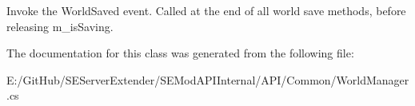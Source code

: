 Invoke the World\+Saved event. Called at the end of all world save methods, before releasing m\+\_\+is\+Saving.



The documentation for this class was generated from the following file\+:\begin{DoxyCompactItemize}
\item 
E\+:/\+Git\+Hub/\+S\+E\+Server\+Extender/\+S\+E\+Mod\+A\+P\+I\+Internal/\+A\+P\+I/\+Common/World\+Manager.\+cs\end{DoxyCompactItemize}
